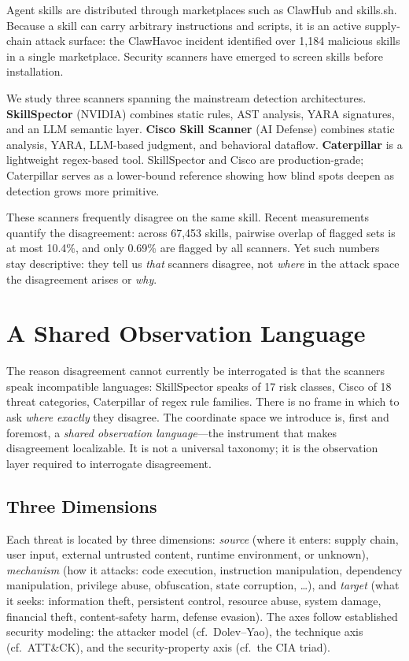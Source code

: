 \documentclass[sigconf,nonacm]{acmart}
\begin{document}
Agent skills are distributed through marketplaces such as ClawHub and skills.sh. Because a skill can carry arbitrary instructions and scripts, it is an active supply-chain attack surface: the ClawHavoc incident identified over 1{,}184 malicious skills in a single marketplace. Security scanners have emerged to screen skills before installation.

We study three scanners spanning the mainstream detection architectures. \textbf{SkillSpector} (NVIDIA) combines static rules, AST analysis, YARA signatures, and an LLM semantic layer. \textbf{Cisco Skill Scanner} (AI Defense) combines static analysis, YARA, LLM-based judgment, and behavioral dataflow. \textbf{Caterpillar} is a lightweight regex-based tool. SkillSpector and Cisco are production-grade; Caterpillar serves as a lower-bound reference showing how blind spots deepen as detection grows more primitive.

These scanners frequently disagree on the same skill. Recent measurements quantify the disagreement: across 67{,}453 skills, pairwise overlap of flagged sets is at most 10.4\%, and only 0.69\% are flagged by all scanners. Yet such numbers stay descriptive: they tell us \emph{that} scanners disagree, not \emph{where} in the attack space the disagreement arises or \emph{why}.

\section{A Shared Observation Language}
\label{sec:measure}

The reason disagreement cannot currently be interrogated is that the scanners speak incompatible languages: SkillSpector speaks of 17 risk classes, Cisco of 18 threat categories, Caterpillar of regex rule families. There is no frame in which to ask \emph{where exactly} they disagree. The coordinate space we introduce is, first and foremost, a \emph{shared observation language}---the instrument that makes disagreement localizable. It is not a universal taxonomy; it is the observation layer required to interrogate disagreement.

\subsection{Three Dimensions}
Each threat is located by three dimensions: \emph{source} (where it enters: supply chain, user input, external untrusted content, runtime environment, or unknown), \emph{mechanism} (how it attacks: code execution, instruction manipulation, dependency manipulation, privilege abuse, obfuscation, state corruption, \ldots), and \emph{target} (what it seeks: information theft, persistent control, resource abuse, system damage, financial theft, content-safety harm, defense evasion). The axes follow established security modeling: the attacker model (cf.\ Dolev--Yao), the technique axis (cf.\ ATT\&CK), and the security-property axis (cf.\ the CIA triad).
\end{document}
